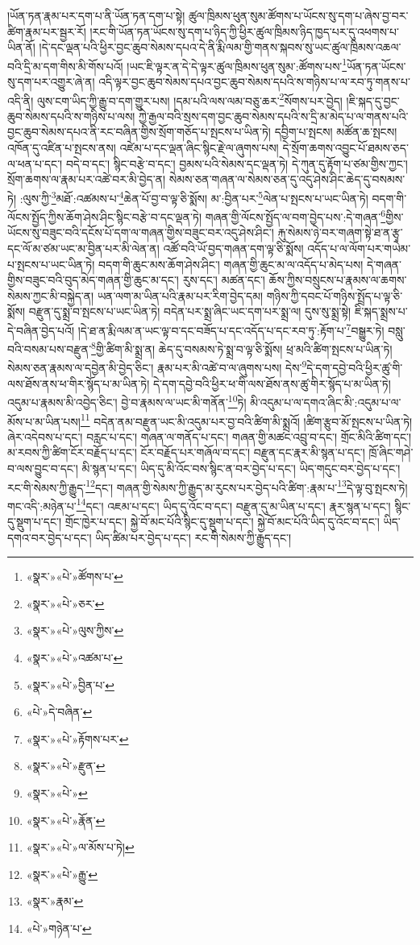 །ཡོན་ཏན་རྣམ་པར་དག་པ་ནི་ཡོན་ཏན་དག་པ་སྟེ། ཚུལ་ཁྲིམས་ཕུན་སུམ་ཚོགས་པ་ཡོངས་སུ་དག་པ་ཞེས་བྱ་བར་ཚིག་རྣམ་པར་སྦྱར་རོ། །རང་གི་ཡོན་ཏན་ཡོངས་སུ་དག་པ་ཉིད་ཀྱི་ཕྱིར་ཚུལ་ཁྲིམས་ཉིད་ཁྱད་པར་དུ་འཕགས་པ་ཡིན་ནོ། །དེ་དང་ལྡན་པའི་ཕྱིར་བྱང་ཆུབ་སེམས་དཔའ་དེ་ནི་རྨི་ལམ་གྱི་གནས་སྐབས་སུ་ཡང་ཚུལ་ཁྲིམས་འཆལ་བའི་དྲི་མ་དག་གིས་མི་གོས་པའོ། །ཡང་ཇི་ལྟར་ན་དེ་དེ་ལྟར་ཚུལ་ཁྲིམས་ཕུན་སུམ་:ཚོགས་པས་\footnote{«སྣར་»«པེ་»ཚོགས་པ་}ཡོན་ཏན་ཡོངས་སུ་དག་པར་འགྱུར་ཞེ་ན། འདི་ལྟར་བྱང་ཆུབ་སེམས་དཔའ་བྱང་ཆུབ་སེམས་དཔའི་ས་གཉིས་པ་ལ་རབ་ཏུ་གནས་པ་འདི་ནི། ལུས་ངག་ཡིད་ཀྱི་རྒྱུ་བ་དག་གྱུར་པས། །དམ་པའི་ལས་ལམ་བཅུ་ཆར་\footnote{«སྣར་»«པེ་»ཅར་}སོགས་པར་བྱེད། །ཇི་སྐད་དུ་བྱང་ཆུབ་སེམས་དཔའི་ས་གཉིས་པ་ལས། ཀྱེ་རྒྱལ་བའི་སྲས་དག་བྱང་ཆུབ་སེམས་དཔའི་ས་དྲི་མ་མེད་པ་ལ་གནས་པའི་བྱང་ཆུབ་སེམས་དཔའ་ནི་རང་བཞིན་གྱིས་སྲོག་གཅོད་པ་སྤངས་པ་ཡིན་ཏེ། དབྱིག་པ་སྤངས། མཚོན་ཆ་སྤངས། འཁོན་དུ་འཛིན་པ་སྤངས་ནས། འཛེམ་པ་དང་ལྡན་ཞིང་སྙིང་རྗེ་ལ་ཞུགས་པས། དེ་སྲོག་ཆགས་འབྱུང་པོ་ཐམས་ཅད་ལ་ཕན་པ་དང་། བདེ་བ་དང་། སྙིང་བརྩེ་བ་དང་། བྱམས་པའི་སེམས་དང་ལྡན་ཏེ། དེ་ཀུན་དུ་རྟོག་པ་ཙམ་གྱིས་ཀྱང་། སྲོག་ཆགས་ལ་རྣམ་པར་འཚེ་བར་མི་བྱེད་ན། སེམས་ཅན་གཞན་ལ་སེམས་ཅན་དུ་འདུ་ཤེས་ཤིང་ཆེད་དུ་བསམས་ཏེ། :ལུས་ཀྱི་\footnote{«སྣར་»«པེ་»ལུས་ཀྱིས་}མཐོ་:འཚམས་པ་\footnote{«སྣར་»«པེ་»འཚམ་པ་}ཆེན་པོ་བྱ་བ་ལྟ་ཅི་སྨོས། མ་:བྱིན་པར་\footnote{«སྣར་»«པེ་»བྱིན་པ་}ལེན་པ་སྤངས་པ་ཡང་ཡིན་ཏེ། བདག་གི་ལོངས་སྤྱོད་ཀྱིས་ཆོག་ཤེས་ཤིང་སྙིང་བརྩེ་བ་དང་ལྡན་ཏེ། གཞན་གྱི་ལོངས་སྤྱོད་ལ་བག་བྱེད་པས་:དེ་གཞན་\footnote{«པེ་»དེ་བཞིན་}གྱིས་ཡོངས་སུ་བཟུང་བའི་དངོས་པོ་དག་ལ་གཞན་གྱིས་བཟུང་བར་འདུ་ཤེས་ཤིང་། རྐུ་སེམས་ཉེ་བར་གཞག་སྟེ་ཐ་ན་རྩྭ་དང་ལོ་མ་ཙམ་ཡང་མ་བྱིན་པར་མི་ལེན་ན། འཚོ་བའི་ཡོ་བྱད་གཞན་དག་ལྟ་ཅི་སྨོས། འདོད་པ་ལ་ལོག་པར་གཡེམ་པ་སྤངས་པ་ཡང་ཡིན་ཏེ། བདག་གི་ཆུང་མས་ཆོག་ཤེས་ཤིང་། གཞན་གྱི་ཆུང་མ་ལ་འདོད་པ་མེད་པས། དེ་གཞན་གྱིས་བཟུང་བའི་བུད་མེད་གཞན་གྱི་ཆུང་མ་དང་། རུས་དང་། མཚན་དང་། ཆོས་ཀྱིས་བསྲུངས་པ་རྣམས་ལ་ཆགས་སེམས་ཀྱང་མི་བསྐྱེད་ན། ཡན་ལག་མ་ཡིན་པའི་རྣམ་པར་རིག་བྱེད་དམ། གཉིས་ཀྱི་དབང་པོ་གཉིས་སྤྲོད་པ་ལྟ་ཅི་སྨོས། བརྫུན་དུ་སྨྲ་བ་སྤངས་པ་ཡང་ཡིན་ཏེ། བདེན་པར་སྨྲ་ཞིང་ཡང་དག་པར་སྨྲ་ལ། དུས་སུ་སྨྲ་སྟེ། ཇི་སྐད་སྨྲས་པ་དེ་བཞིན་བྱེད་པའོ། །དེ་ཐ་ན་རྨི་ལམ་ན་ཡང་ལྟ་བ་དང་བཟོད་པ་དང་འདོད་པ་དང་རབ་ཏུ་:རྟོག་པ་\footnote{«སྣར་»«པེ་»རྟོགས་པར་}བསྒྱུར་ཏེ། བསླུ་བའི་བསམ་པས་བརྫུན་\footnote{«སྣར་»«པེ་»རྫུན་}གྱི་ཚིག་མི་སྨྲ་ན། ཆེད་དུ་བསམས་ཏེ་སྨྲ་བ་ལྟ་ཅི་སྨོས། ཕྲ་མའི་ཚིག་སྤངས་པ་ཡིན་ཏེ། སེམས་ཅན་རྣམས་ལ་དབྱེན་མི་བྱེད་ཅིང་། རྣམ་པར་མི་འཚེ་བ་ལ་ཞུགས་པས། དེས་\footnote{«སྣར་»«པེ་»}དེ་དག་དབྱེ་བའི་ཕྱིར་ཚུ་གི་ལས་ཐོས་ནས་ཕ་གིར་སྙོད་པ་མ་ཡིན་ཏེ། དེ་དག་དབྱེ་བའི་ཕྱིར་ཕ་གི་ལས་ཐོས་ནས་ཚུ་གིར་སྙོད་པ་མ་ཡིན་ཏེ། འདུམ་པ་རྣམས་མི་འབྱེད་ཅིང་། བྱེ་བ་རྣམས་ལ་ཡང་མི་གནོན་\footnote{«སྣར་»«པེ་»རྣོན་}ཏེ། མི་འདུམ་པ་ལ་དགའ་ཞིང་མི་:འདུམ་པ་ལ་མོས་པ་མ་ཡིན་པས།\footnote{«སྣར་»«པེ་»ལ་མོས་པ་ཏེ།} བདེན་ནམ་བརྫུན་ཡང་མི་འདུམ་པར་བྱ་བའི་ཚིག་མི་སྨྲའོ། །ཚིག་རྩུབ་མོ་སྤངས་པ་ཡིན་ཏེ། ཞེར་འདེབས་པ་དང་། བརླང་པ་དང་། གཞན་ལ་གནོད་པ་དང་། གཞན་གྱི་མཚང་འབྲུ་བ་དང་། གྲོང་མིའི་ཚིག་དང་། མ་རབས་ཀྱི་ཚིག་ངོར་བརྗོད་པ་དང་། ངོར་བརྗོད་པར་གཞོལ་བ་དང་། བརྫུན་དང་རྣར་མི་སྙན་པ་དང་། ཁྲོ་ཞིང་གཤེ་བ་ལས་བྱུང་བ་དང་། མི་སྙན་པ་དང་། ཡིད་དུ་མི་འོང་བས་སྙིང་ན་བར་བྱེད་པ་དང་། ཡིད་གདུང་བར་བྱེད་པ་དང་། རང་གི་སེམས་ཀྱི་རྒྱུད་\footnote{«སྣར་»«པེ་»རྒྱུ་}དང་། གཞན་གྱི་སེམས་ཀྱི་རྒྱུད་མ་རུངས་པར་བྱེད་པའི་ཚིག་:རྣམ་པ་\footnote{«སྣར་»རྣམ་}དེ་ལྟ་བུ་སྤངས་ཏེ། གང་འདི་:མཉེན་པ་\footnote{«པེ་»གཉེན་པ་}དང་། འཇམ་པ་དང་། ཡིད་དུ་འོང་བ་དང་། བརྫུན་དུ་མ་ཡིན་པ་དང་། རྣར་སྙན་པ་དང་། སྙིང་དུ་སྡུག་པ་དང་། གྲོང་ཁྱེར་པ་དང་། སྐྱེ་བོ་མང་པོའི་སྙིང་དུ་སྡུག་པ་དང་། སྐྱེ་བོ་མང་པོའི་ཡིད་དུ་འོང་བ་དང་། ཡིད་དགའ་བར་བྱེད་པ་དང་། ཡིད་ཚིམ་པར་བྱེད་པ་དང་། རང་གི་སེམས་ཀྱི་རྒྱུད་དང་། 